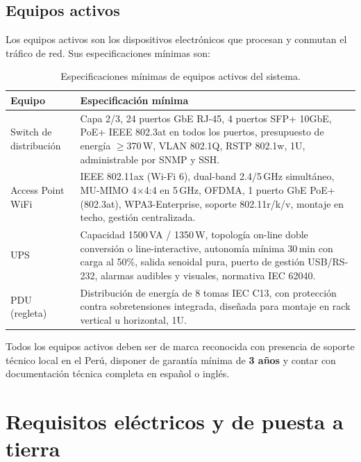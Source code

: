 \subsection{Equipos activos}

Los equipos activos son los dispositivos electrónicos que procesan y conmutan
el tráfico de red. Sus especificaciones mínimas son:

\begin{table}[H]
    \centering
    \caption{Especificaciones mínimas de equipos activos del sistema.}
    \label{tab:activos}
    \begin{tabular}{|p{3.5cm}|p{10cm}|}
        \hline
        \textbf{Equipo} & \textbf{Especificación mínima} \\
        \hline
        Switch de distribución &
        Capa 2/3, 24 puertos GbE RJ-45, 4 puertos SFP+ 10GbE,
        PoE+ IEEE 802.3at en todos los puertos, presupuesto de energía
        $\geq$370\,W, VLAN 802.1Q, RSTP 802.1w, 1U, administrable
        por SNMP y SSH. \\
        \hline
        Access Point WiFi &
        IEEE 802.11ax (Wi-Fi 6), dual-band 2.4/5\,GHz simultáneo,
        MU-MIMO 4$\times$4:4 en 5\,GHz, OFDMA, 1 puerto GbE PoE+
        (802.3at), WPA3-Enterprise, soporte 802.11r/k/v,
        montaje en techo, gestión centralizada. \\
        \hline
        UPS &
        Capacidad 1500\,VA / 1350\,W, topología on-line doble conversión
        o line-interactive, autonomía mínima 30\,min con carga al 50\%,
        salida senoidal pura, puerto de gestión USB/RS-232, alarmas
        audibles y visuales, normativa IEC 62040. \\
        \hline
        PDU (regleta) &
        Distribución de energía de 8 tomas IEC C13, con protección
        contra sobretensiones integrada, diseñada para montaje en rack
        vertical u horizontal, 1U. \\
        \hline
    \end{tabular}
\end{table}%
\nobreak\vspace{-0.3cm}
Todos los equipos activos deben ser de marca reconocida con presencia de soporte
técnico local en el Perú, disponer de garantía mínima de \textbf{3 años} y
contar con documentación técnica completa en español o inglés.

\section{Requisitos eléctricos y de puesta a tierra}
\label{sec:electrico_tierra}

